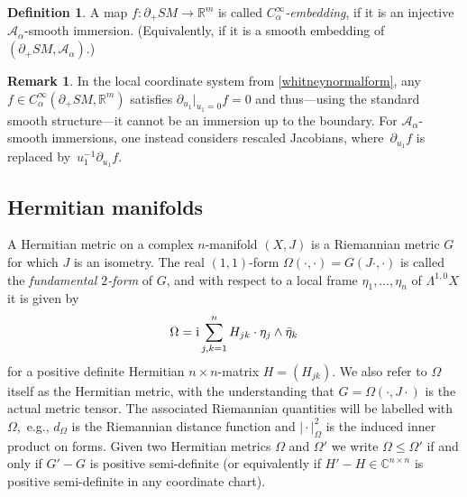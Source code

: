 \documentclass[pdftex]{sigma}
\numberwithin{equation}{section}
\theoremstyle{definition}
\newtheorem{Definition}[Theorem]{Definition}
\newtheorem{Remark}[Theorem]{Remark}
\newcommand{\R}{\mathbb{R}} %
\newcommand{\C}{\mathbb{C}} %
\newcommand{\1}{{\bf 1}}
\begin{document}
\begin{Definition}\label{def_calphaemb}
	A map $f\colon \partial_+SM\rightarrow \R^m$ is called {\it $C_\alpha^\infty$-embedding}, if it is an injective $\mathcal A_\alpha$-smooth immersion. (Equivalently, if it is a smooth embedding of $(\partial_+SM,\mathcal A_\alpha)$.)
\end{Definition}

\begin{Remark} In the local coordinate system from \eqref{whitneynormalform}, any $f\in C_\alpha^\infty(\partial_+SM,\R^m)$ satisfies ${\partial_{u_1}|_{u_1=0}f = 0}$ and thus---using the standard smooth structure---it cannot be an immersion up to the boundary. For $\mathcal A_\alpha$-smooth immersions, one instead considers rescaled Jacobians, where~$\partial_{u_1}f$ is replaced by~$u_1^{-1}\partial_{u_1}f$.
\end{Remark}

\subsection{Hermitian manifolds}\label{s_metriccx} A Hermitian metric on a complex $n$-manifold $(X,J)$ is a Riemannian metric $G$ for which $J$ is an isometry. The real $(1,1)$-form $\Omega(\cdot,\cdot)=G(J\cdot,\cdot)$ is called the {\it fundamental $2$-form} of $G$, and with respect to a local frame $\eta_1,\dots,\eta_n$ of $\Lambda^{1,0}X$ it is given by
\begin{equation}\label{generalomegah}
\Omega = {\rm i} \sum_{j,k=1}^n H_{jk} \cdot \eta_j\wedge\bar\eta_k
\end{equation}
for a positive definite Hermitian $n\times n$-matrix $H=(H_{jk})$. We also refer to $\Omega$ itself as the Hermitian metric, with the understanding that $G=\Omega(\cdot,J\cdot)$ is the actual metric tensor. The associated Riemannian quantities will be labelled with $\Omega$,~e.g., $d_\Omega$ is the Riemannian distance function and $\vert\cdot\vert_\Omega^2$ is the induced inner product on forms.
Given two Hermitian metrics $\Omega$ and $\Omega'$ we write $\Omega \le \Omega'$ if and only if $G'-G$ is positive semi-definite (or equivalently if $H'-H\in \C^{n\times n}$ is positive semi-definite in any coordinate chart).
\end{document}
